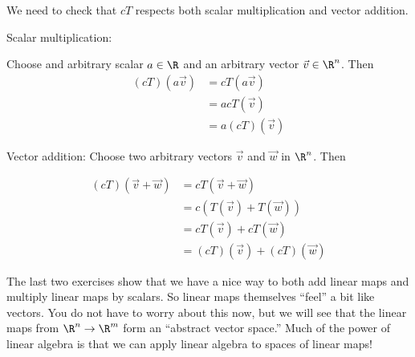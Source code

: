 \documentclass{ximera}
\begin{document}
\begin{free-response}
We need to check that $cT$ respects both scalar multiplication and vector addition.
 
 Scalar multiplication:
 
 Choose and arbitrary scalar $a \in \R$ and an arbitrary vector $\vec{v} \in \R^n$.  Then
 	\begin{align*}
 		(cT)(a\vec{v}) &= cT(a\vec{v})\\
 		&= acT(\vec{v})\\
 		&=a(cT)(\vec{v})
 	\end{align*}
 	
 	Vector addition:
 	Choose two arbitrary vectors $\vec{v}$ and $\vec{w}$ in $\R^n$.  Then
 	
 	\begin{align*}
 		(cT)(\vec{v}+\vec{w}) &= cT(\vec{v}+\vec{w})\\
 		&= c\left(T(\vec{v})+T(\vec{w})\right)\\
 		&=cT(\vec{v})+cT(\vec{w})\\
 		&=(cT)(\vec{v})+(cT)(\vec{w})
 	\end{align*}
\end{free-response}


\begin{observation}
  The last two exercises show that we have a nice way to both add
  linear maps and multiply linear maps by scalars.  So linear maps
  themselves ``feel'' a bit like vectors.  You do not have to worry
  about this now, but we will see that the linear maps from $\R^n \to
  \R^m$ form an ``abstract vector space.''  Much of the power of
  linear algebra is that we can apply linear algebra to spaces of
  linear maps!
\end{observation}
	
\end{document}
